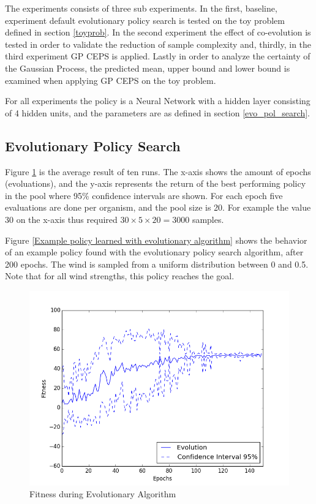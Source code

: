 The experiments consists of three sub experiments. In the first, baseline, experiment default evolutionary policy search is tested on the toy problem defined in section \ref{toyprob}. In the second experiment the effect of co-evolution is tested in order to validate the reduction of sample complexity and, thirdly, in the third experiment GP CEPS is applied. Lastly in order to analyze the certainty of the Gaussian Process, the predicted mean, upper bound and lower bound is examined when applying GP CEPS on the toy problem.

For all experiments the policy is a Neural Network with a hidden layer consisting of 4 hidden units, and the parameters are as defined in section \ref{evo_pol_search}. 

\subsection{Evolutionary Policy Search}

Figure \ref{Fitness during Evolutionary Algorithm} is the average result of ten runs. The x-axis shows the amount of epochs (evoluations), and the y-axis represents the return of the best performing policy in the pool where 95\% confidence intervals are shown. For each epoch five evaluations are done per organism, and the pool size is 20. For example the value 30 on the x-axis thus required $30 \times 5 \times 20 = 3000$ samples.

Figure \ref{Example policy learned with evolutionary algorithm} shows the behavior of an example policy found with the evolutionary policy search algorithm, after 200 epochs. The wind is sampled from a uniform distribution between 0 and 0.5. Note that for all wind strengths, this policy reaches the goal. 

\begin{figure}[ht]
  \centering
  \includegraphics[scale=0.5]{images/evo.png}
  \caption{Fitness during Evolutionary Algorithm}\label{Fitness during Evolutionary Algorithm}
\end{figure}

